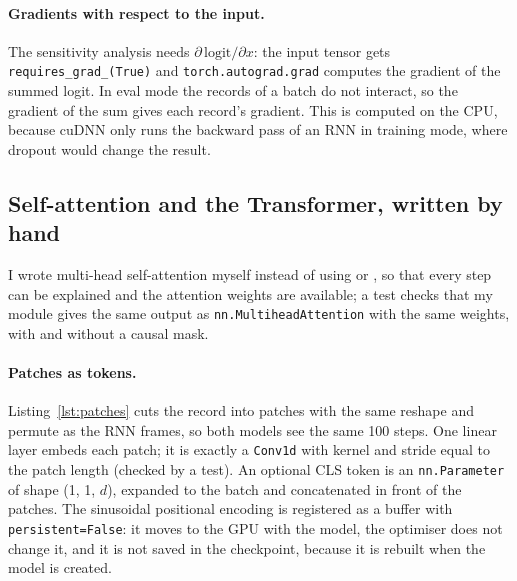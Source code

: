 

\paragraph{Gradients with respect to the input.} The sensitivity analysis needs
$\partial\,\mathrm{logit}/\partial x$: the input tensor gets \texttt{requires\_grad\_(True)} and
\texttt{torch.autograd.grad} computes the gradient of the summed logit. In eval mode the records of a batch do
not interact, so the gradient of the sum gives each record's gradient. This is computed on the CPU, because
cuDNN only runs the backward pass of an RNN in training mode, where dropout would change the result.

\subsection{Self-attention and the Transformer, written by hand}

I wrote multi-head self-attention myself instead of using  or
, so that every step can be explained and the attention weights are
available; a test checks that my module gives the same output as \texttt{nn.MultiheadAttention} with the
same weights, with and without a causal mask.

\paragraph{Patches as tokens.} Listing~\ref{lst:patches} cuts the record into patches with the same
reshape and permute as the RNN frames, so both models see the same 100 steps. One linear layer embeds each
patch; it is exactly a \texttt{Conv1d} with kernel and stride equal to the patch length (checked by a test).
An optional CLS token is an \texttt{nn.Parameter} of shape (1, 1, $d$), expanded to the batch and
concatenated in front of the patches. The sinusoidal positional encoding is registered as a buffer with
\texttt{persistent=False}: it moves to the GPU with the model, the optimiser does not change it, and it is
not saved in the checkpoint, because it is rebuilt when the model is created.



